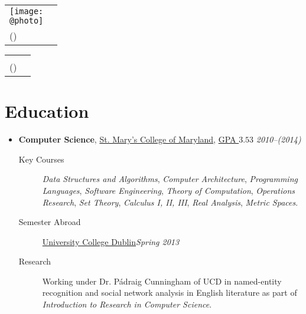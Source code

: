 \documentclass[11pt,letterpaper]{article}
\author{Sean Allred}
\makeatletter
\newcommand{\position}[5]{\item%
  \begin{tabular*}{1.0\linewidth}{l@{\extracolsep{\fill}}r}
    #1 & #2\\
    \textit{#3} & \textit{#4---#5}
  \end{tabular*}}
\renewcommand{\position}[6][]{%
\item[#1] \hspace*{-2em}\textbf{#4}, #2, #3\hfill
  \textit{#5--#6}\vspace*{-.8em}}
\renewcommand{\maketitle}{%
  \noindent
  \ifdefined\@photo
  \usepackage{multirow}
  \begin{tabular*}{1.0\linewidth}{l@{\extracolsep{\fill}}r}
    \multirow{2}{*}{\texttt{[image: \\@photo]}}\\
     {\@namestyle\@author}           & \@addressA\\
    {\@emailstyle\@email} (\@phone)  & \@addressB
  \end{tabular*}
  \else
  \begin{tabular*}{1.0\linewidth}{l@{\extracolsep{\fill}}r}
     {\@namestyle\@author}           & \@addressA\\
    {\@emailstyle\@email} (\@phone)  & \@addressB
  \end{tabular*}
  \fi
}
\newcommand{\course}[1]{\textit{#1}}
\newcommand{\smcm}{\href{http://www.smcm.edu}
                        {St. Mary's College of Maryland}}
\makeatother
\begin{document}
\maketitle

\section*{Education}
\begin{itemize}
\position[] {\smcm}
          {\href{http://dl.dropbox.com/u/17471132/transcript20130330.pdf}
                {GPA $3.53$}}
          {Computer Science}
          {2010}{(2014)}
          \begin{description}
          \item[Key Courses]
            \course{Data Structures and Algorithms},
            \course{Computer Architecture},
            \course{Programming Languages},
            \course{Software Engineering},
            \course{Theory of Computation},
            \course{Operations Research},
            \course{Set Theory},
            \course{Calculus I, II, III},
            \course{Real Analysis},
            \course{Metric Spaces}.
          \item[Semester Abroad] \href{http://www.ucd.ie}{University College Dublin}\hfill \textit{Spring 2013}
          \item[Research] Working under Dr. P\'adraig Cunningham of UCD in named-entity recognition and social network analysis in English literature as part of \course{Introduction to Research in Computer Science}.
          \end{description}
\end{itemize}
\end{document}
